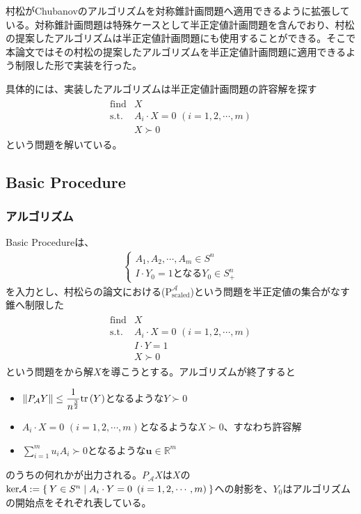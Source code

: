 村松がChubanovのアルゴリズムを対称錐計画問題へ適用できるように拡張している\cite{SymmetricCone}。対称錐計画問題は特殊ケースとして半正定値計画問題を含んでおり、村松の提案したアルゴリズムは半正定値計画問題にも使用することができる。そこで本論文ではその村松の提案したアルゴリズムを半正定値計画問題に適用できるよう制限した形で実装を行った。

具体的には、実装したアルゴリズムは半正定値計画問題の許容解を探す
\begin{align*}
  \begin{array}{ll}
    \text{find} & X \\
    \text{s.t.} & A_i \cdot X = 0 \,\, (i = 1, 2, \cdots, m) \\
                & X \succ 0
  \end{array}
\end{align*}
という問題を解いている。

\subsection{Basic Procedure}
\subsubsection{アルゴリズム}
Basic Procedureは、
\begin{align*}
  \begin{cases}
      A_1, A_2, \cdots, A_m \in S^n \\
      I \cdot Y_0 = 1 \text{となる} Y_0 \in S_+^n
    \end{cases}
\end{align*}
を入力とし、村松らの論文における($\mathrm{P}_\mathrm{scaled}^\mathcal{A}$)という問題を半正定値の集合がなす錐へ制限した
\begin{align*}
  \begin{array}{ll}
    \text{find} & X \\
    \text{s.t.} & A_i \cdot X = 0 \,\, \left(i = 1, 2, \cdots, m\right) \\
                & I \cdot Y = 1 \\
                & X \succ 0
  \end{array}
\end{align*}
という問題をから解$X$を導こうとする。アルゴリズムが終了すると
\begin{itemize}
  \item $\displaystyle{\|P_\mathcal{A} Y\| \leq \frac{1}{n^{\frac{3}{2}}} \mathrm{tr}\parenthesis(Y)}$となるような$Y \succ 0$
  \item $A_i \cdot X = 0 \,\, \left(i = 1, 2, \cdots, m\right)$となるような$X \succ 0$、すなわち許容解
  \item $\displaystyle{\sum_{i = 1}^m u_i A_i \succ 0}$となるような$\mathbf{u} \in \mathbb{R}^m$
\end{itemize}
のうちの何れかが出力される。$P_\mathcal{A} X$は$X$の$\mathrm{ker}\mathcal{A} := \Set{Y \in S^n | A_i \cdot Y = 0 \,\, \left(i = 1, 2, \cdots, m\right)}$への射影を、$Y_0$はアルゴリズムの開始点をそれぞれ表している。

